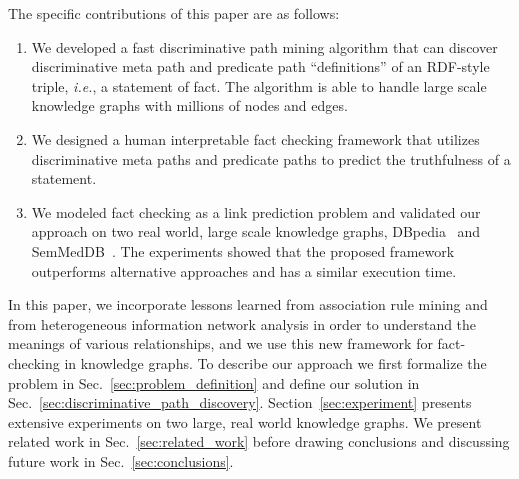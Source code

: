 \documentclass[reprint,twocolumn,showpacs,preprintnumbers,amsmath, aps,pre,amssymb]{revtex4-1}
\newcommand\ie{\emph{i.e.}}
\begin{document}





The specific contributions of this paper are as follows:

\begin{enumerate}
\item We developed a fast discriminative path mining algorithm that can discover discriminative meta path and predicate path ``definitions'' of an RDF-style triple, \ie, a statement of fact. The algorithm is able to handle large scale knowledge graphs with millions of nodes and edges.

\item We designed a human interpretable fact checking framework that utilizes discriminative meta paths and predicate paths to predict the truthfulness of a statement.

\item We modeled fact checking as a link prediction problem and validated our approach on two real world, large scale knowledge graphs, DBpedia~\cite{Lehmann2014} and SemMedDB~\cite{Kilicoglu2012}. The experiments showed that the proposed framework outperforms alternative approaches and has a similar execution time.
\end{enumerate}

In this paper, we incorporate lessons learned from association rule mining and from heterogeneous information network analysis in order to understand the meanings of various relationships, and we use this new framework for fact-checking in knowledge graphs. To describe our approach we first formalize the problem in Sec.~\ref{sec:problem_definition} and define our solution in Sec.~\ref{sec:discriminative_path_discovery}. Section~\ref{sec:experiment} presents extensive experiments on two large, real world knowledge graphs. We present related work in Sec.~\ref{sec:related_work} before drawing conclusions and discussing future work in Sec.~\ref{sec:conclusions}.
\end{document}
